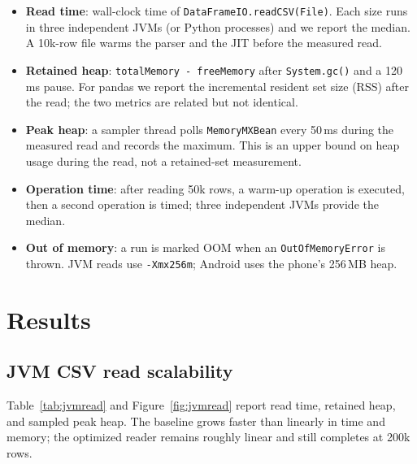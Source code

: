 \documentclass[11pt,a4paper]{article}
\newcommand{\code}[1]{\texttt{#1}}
\begin{document}
\begin{itemize}
  \item \textbf{Read time}: wall-clock time of \code{DataFrameIO.readCSV(File)}.  Each size runs in
        three independent JVMs (or Python processes) and we report the median.  A 10k-row file
        warms the parser and the JIT before the measured read.
  \item \textbf{Retained heap}: \code{totalMemory - freeMemory} after \code{System.gc()} and a
        120\,ms pause.  For pandas we report the incremental resident set size (RSS) after the read;
        the two metrics are related but not identical.
  \item \textbf{Peak heap}: a sampler thread polls \code{MemoryMXBean} every 50\,ms during the
        measured read and records the maximum.  This is an upper bound on heap usage during the
        read, not a retained-set measurement.
  \item \textbf{Operation time}: after reading 50k rows, a warm-up operation is executed, then a
        second operation is timed; three independent JVMs provide the median.
  \item \textbf{Out of memory}: a run is marked OOM when an \code{OutOfMemoryError} is thrown.
        JVM reads use \code{-Xmx256m}; Android uses the phone's 256\,MB heap.
\end{itemize}

\section{Results}

\subsection{JVM CSV read scalability}

Table~\ref{tab:jvmread} and Figure~\ref{fig:jvmread} report read time, retained heap, and sampled
peak heap.  The baseline grows faster than linearly in time and memory; the optimized reader remains
roughly linear and still completes at 200k rows.
\end{document}
